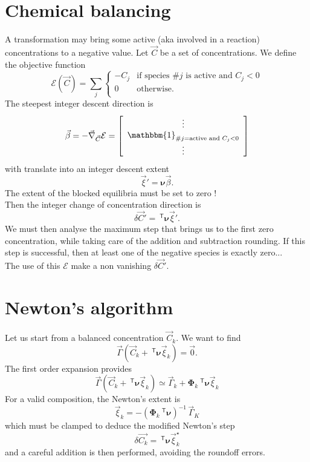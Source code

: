 \documentclass[aps]{revtex4}
\newcommand{\mymat}[1]{\bm{#1}}
\newcommand{\mytrn}[1]{~^{\mathsf{T}}{#1}}
\begin{document}
\section{Chemical balancing}
A transformation may bring some active (aka involved in a reaction) concentrations to a negative value.
Let $\vec{C}$ be a set of concentrations. We define the objective function
$$
	\mathcal{E}(\vec{C}) = \sum_j 
	\left
	\lbrace
		\begin{array}{rl}
		-C_j & \text{if species \#}j\text{ is active and } C_j<0\\
		0    & \text{otherwise.}\\
		\end{array} 
	\right.
$$
The steepest integer descent direction is
$$
	\vec{\beta} = -\vec{\nabla}_{\vec{C}} \mathcal{E} = 
	\left\lbrack
		\begin{array}{c}
		\vdots\\
		\mathbbm{1}_{\text{\#}j=\text{active and } C_j<0}\\
		\vdots
		\end{array}
	\right\rbrack
$$
with translate into an integer descent extent
$$
	\vec{\xi}' = \mymat{\nu} \vec{\beta}.
$$
The extent of the blocked equilibria must be set to zero !\\
Then the integer change of concentration direction is
$$
	\delta\vec{C}' = \mytrn{\mymat{\nu}}\vec{\xi}'.
$$
We must then analyse the maximum step that brings us to the
first zero concentration, while taking care of the addition and subtraction rounding.
If this step is successful, then at least one of the negative species is exactly zero...\\

The use of this $\mathcal{E}$ make a non vanishing $\delta\vec{C}'$.

\section{Newton's algorithm}
Let us start from a balanced concentration $\vec{C}_k$.
We want to find
$$
	\vec{\Gamma}(\vec{C}_k + \mytrn{\mymat{\nu}}\vec{\xi}_k) = \vec{0}.
$$
The first order expansion provides
$$
	\vec{\Gamma}(\vec{C}_k + \mytrn{\mymat{\nu}}\vec{\xi}_k) \simeq 
	\vec{\Gamma}_k + \mymat{\Phi}_k\mytrn{\mymat{\nu}} \vec{\xi}_k
$$
For a valid composition, the Newton's extent is
$$
		\vec{\xi}_k = -\left(\mymat{\Phi}_k\mytrn{\mymat{\nu}}\right)^{-1}\,\vec{\Gamma}_K
$$
which must be clamped to deduce the modified Newton's step
$$
	\delta{\vec{C_k}} = \mytrn{\mymat{\nu}} \vec{\xi}_k^\star
$$
and a careful addition is then performed, avoiding the roundoff errors.
\end{document}
